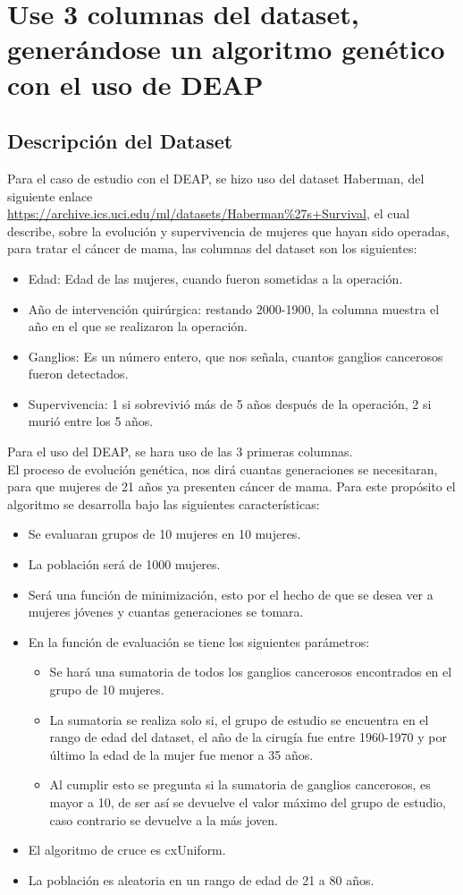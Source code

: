 
\section{\fontsize{14}{0}\selectfont Use 3 columnas del dataset, generándose un algoritmo genético con el uso de DEAP}
\subsection{ Descripción del Dataset}
Para el caso de estudio con el DEAP, se hizo uso del dataset Haberman, del siguiente enlace \url{https://archive.ics.uci.edu/ml/datasets/Haberman\%27s+Survival}, el cual describe, sobre la evolución y supervivencia de mujeres que hayan sido operadas, para tratar el cáncer de mama, las columnas del dataset son los siguientes: 
\begin{itemize}
	\item Edad: Edad de las mujeres, cuando fueron sometidas a la operación. 
	\item Año de intervención quirúrgica: restando 2000-1900, la columna muestra el año en el que se realizaron la operación. 
	\item Ganglios: Es un número entero, que nos señala, cuantos ganglios cancerosos fueron detectados.
	\item Supervivencia: 1 si sobrevivió más de 5 años después de la operación, 2 si murió entre los 5 años.  
\end{itemize}
Para el uso del DEAP, se hara uso de las 3 primeras columnas.\\
El proceso de evolución genética, nos dirá cuantas generaciones se necesitaran, para que mujeres de 21 años ya presenten cáncer de mama. Para este propósito el algoritmo se desarrolla bajo las siguientes características:
\begin{itemize}
	\item Se evaluaran grupos de 10 mujeres en 10 mujeres.
	\item La población será de 1000 mujeres.
	\item Será una función de minimización, esto por el hecho de que se desea ver a mujeres jóvenes y cuantas generaciones se tomara.
	\item En la función de evaluación se tiene los siguientes parámetros:
	\begin{itemize}
		\item Se hará una sumatoria de todos los ganglios cancerosos encontrados en el grupo de 10 mujeres.
		\item La sumatoria se realiza solo si, el grupo de estudio se encuentra en el rango de edad del dataset, el año de la cirugía fue entre 1960-1970 y por último la edad de la mujer fue menor a 35 años. 
		\item Al cumplir esto se pregunta si la sumatoria de ganglios cancerosos, es mayor a 10, de ser así se devuelve el valor máximo del grupo de estudio, caso contrario se devuelve a la más joven.
		
	\end{itemize}
	\item El algoritmo de cruce es cxUniform.
	\item La población es aleatoria en un rango de edad de 21 a 80 años.
	
\end{itemize}
